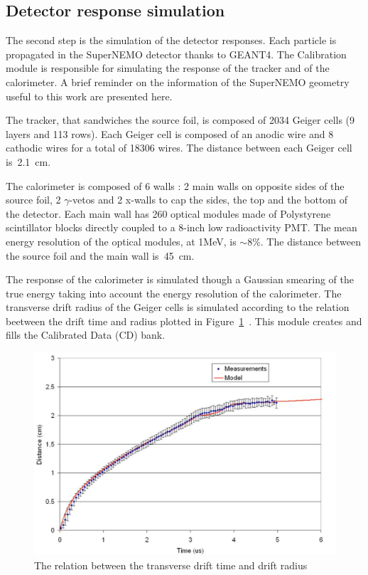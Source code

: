 \documentclass[main.tex]{subfiles}
\begin{document}
\FloatBarrier


\subsection{Detector response simulation}\label{sec:DectectorResponseBi214}


\noindent The second step is the simulation of the detector responses. Each particle is propagated in the SuperNEMO detector thanks to GEANT4. The Calibration module is responsible for simulating the response of the tracker and of the calorimeter. A brief reminder on the information of the SuperNEMO geometry useful to this work are presented here.


\bigskip


\noindent The tracker, that sandwiches the source foil, is composed of 2034 Geiger cells (9 layers and 113 rows). Each Geiger cell is composed of an anodic wire and 8 cathodic wires for a total of 18306 wires. The distance between each Geiger cell is~2.1~cm.


\bigskip


\noindent The calorimeter is composed of 6 walls : 2 main walls on opposite sides of the source foil, 2 $\gamma$-vetos and 2 x-walls to cap the sides, the top and the bottom of the detector. Each main wall has 260 optical modules made of Polystyrene scintillator blocks directly coupled to a 8-inch low radioactivity PMT. The mean energy resolution of the optical modules, at 1MeV, is $\sim$8\%. The distance between the source foil and the main wall is~45~cm.   


\bigskip


\noindent The response of the calorimeter is simulated though a Gaussian smearing of the true energy taking into account the energy resolution of the calorimeter. The transverse drift radius of the Geiger cells is simulated according to the relation beetween the drift time and radius plotted in Figure~\ref{drift_time}~\cite{DriftTimeModel}. This module creates and fills the Calibrated Data (CD) bank.


\begin{figure}[h!]
\begin{center}
\includegraphics[scale=0.25]{pictures/Chap5/drift_time.png}
\caption{The relation between the transverse drift time and drift radius}
\label{drift_time}
\end{center}
\end{figure}
\end{document}
